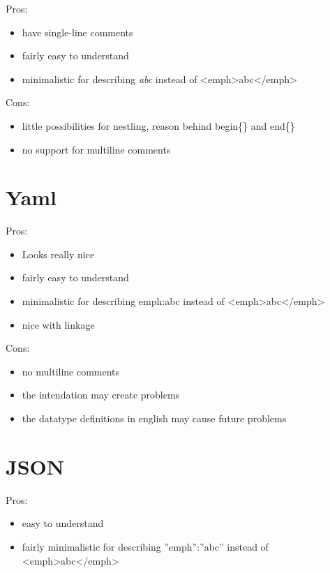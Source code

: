 \documentclass{book}
\begin{document}
	Pros:
	
	\begin{itemize}
		\item have single-line comments
		\item fairly easy to understand
		\item minimalistic for describing \emph{abc} instead of <emph>abc</emph>
	\end{itemize}
	
	Cons:
	
	\begin{itemize}
		\item little possibilities for nestling, reason behind begin\{\} and end\{\}
		\item no support for multiline comments
	\end{itemize}
	
	\section{Yaml}
	
	Pros:
	
	\begin{itemize}
		\item Looks really nice
		\item fairly easy to understand
		\item minimalistic for describing emph:abc instead of <emph>abc</emph>
		\item nice with linkage
	\end{itemize}
	
	Cons:
	
	\begin{itemize}
		\item no multiline comments
		\item the intendation may create problems
		\item the datatype definitions in english may cause future problems
	\end{itemize}
	
	\section{JSON}
	
	Pros:
	
	\begin{itemize}
		\item easy to understand
		\item fairly minimalistic for describing ''emph'':''abc'' instead of <emph>abc</emph>
	\end{itemize}
	
\end{document}
